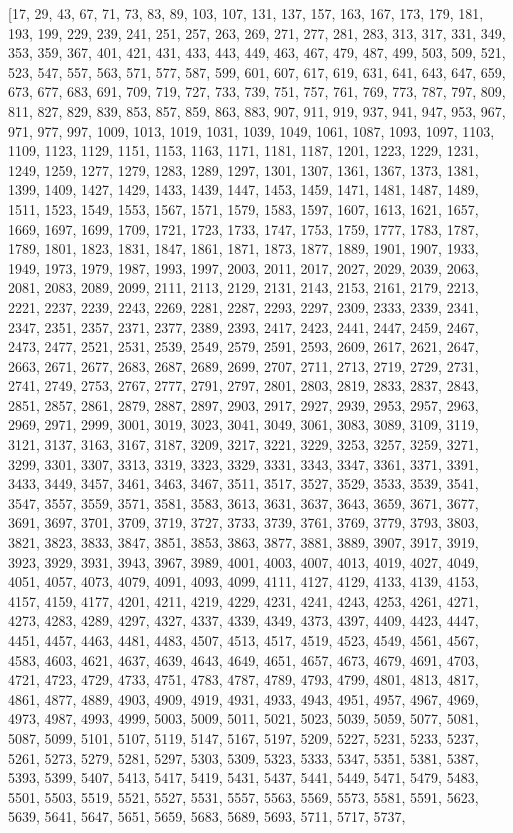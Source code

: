 \documentclass[10pt,twocolumn]{article}
\begin{document}
\begin{thebibliography}{9}
[17, 29, 43, 67, 71, 73, 83, 89, 103, 107, 131, 137, 157, 163, 167, 173, 179, 181, 193, 199, 229, 239, 241, 251, 257, 263, 269, 271, 277, 281, 283, 313, 317, 331, 349, 353, 359, 367, 401, 421, 431, 433, 443, 449, 463, 467, 479, 487, 499, 503, 509, 521, 523, 547, 557, 563, 571, 577, 587, 599, 601, 607, 617, 619, 631, 641, 643, 647, 659, 673, 677, 683, 691, 709, 719, 727, 733, 739, 751, 757, 761, 769, 773, 787, 797, 809, 811, 827, 829, 839, 853, 857, 859, 863, 883, 907, 911, 919, 937, 941, 947, 953, 967, 971, 977, 997, 1009, 1013, 1019, 1031, 1039, 1049, 1061, 1087, 1093, 1097, 1103, 1109, 1123, 1129, 1151, 1153, 1163, 1171, 1181, 1187, 1201, 1223, 1229, 1231, 1249, 1259, 1277, 1279, 1283, 1289, 1297, 1301, 1307, 1361, 1367, 1373, 1381, 1399, 1409, 1427, 1429, 1433, 1439, 1447, 1453, 1459, 1471, 1481, 1487, 1489, 1511, 1523, 1549, 1553, 1567, 1571, 1579, 1583, 1597, 1607, 1613, 1621, 1657, 1669, 1697, 1699, 1709, 1721, 1723, 1733, 1747, 1753, 1759, 1777, 1783, 1787, 1789, 1801, 1823, 1831, 1847, 1861, 1871, 1873, 1877, 1889, 1901, 1907, 1933, 1949, 1973, 1979, 1987, 1993, 1997, 2003, 2011, 2017, 2027, 2029, 2039, 2063, 2081, 2083, 2089, 2099, 2111, 2113, 2129, 2131, 2143, 2153, 2161, 2179, 2213, 2221, 2237, 2239, 2243, 2269, 2281, 2287, 2293, 2297, 2309, 2333, 2339, 2341, 2347, 2351, 2357, 2371, 2377, 2389, 2393, 2417, 2423, 2441, 2447, 2459, 2467, 2473, 2477, 2521, 2531, 2539, 2549, 2579, 2591, 2593, 2609, 2617, 2621, 2647, 2663, 2671, 2677, 2683, 2687, 2689, 2699, 2707, 2711, 2713, 2719, 2729, 2731, 2741, 2749, 2753, 2767, 2777, 2791, 2797, 2801, 2803, 2819, 2833, 2837, 2843, 2851, 2857, 2861, 2879, 2887, 2897, 2903, 2917, 2927, 2939, 2953, 2957, 2963, 2969, 2971, 2999, 3001, 3019, 3023, 3041, 3049, 3061, 3083, 3089, 3109, 3119, 3121, 3137, 3163, 3167, 3187, 3209, 3217, 3221, 3229, 3253, 3257, 3259, 3271, 3299, 3301, 3307, 3313, 3319, 3323, 3329, 3331, 3343, 3347, 3361, 3371, 3391, 3433, 3449, 3457, 3461, 3463, 3467, 3511, 3517, 3527, 3529, 3533, 3539, 3541, 3547, 3557, 3559, 3571, 3581, 3583, 3613, 3631, 3637, 3643, 3659, 3671, 3677, 3691, 3697, 3701, 3709, 3719, 3727, 3733, 3739, 3761, 3769, 3779, 3793, 3803, 3821, 3823, 3833, 3847, 3851, 3853, 3863, 3877, 3881, 3889, 3907, 3917, 3919, 3923, 3929, 3931, 3943, 3967, 3989, 4001, 4003, 4007, 4013, 4019, 4027, 4049, 4051, 4057, 4073, 4079, 4091, 4093, 4099, 4111, 4127, 4129, 4133, 4139, 4153, 4157, 4159, 4177, 4201, 4211, 4219, 4229, 4231, 4241, 4243, 4253, 4261, 4271, 4273, 4283, 4289, 4297, 4327, 4337, 4339, 4349, 4373, 4397, 4409, 4423, 4447, 4451, 4457, 4463, 4481, 4483, 4507, 4513, 4517, 4519, 4523, 4549, 4561, 4567, 4583, 4603, 4621, 4637, 4639, 4643, 4649, 4651, 4657, 4673, 4679, 4691, 4703, 4721, 4723, 4729, 4733, 4751, 4783, 4787, 4789, 4793, 4799, 4801, 4813, 4817, 4861, 4877, 4889, 4903, 4909, 4919, 4931, 4933, 4943, 4951, 4957, 4967, 4969, 4973, 4987, 4993, 4999, 5003, 5009, 5011, 5021, 5023, 5039, 5059, 5077, 5081, 5087, 5099, 5101, 5107, 5119, 5147, 5167, 5197, 5209, 5227, 5231, 5233, 5237, 5261, 5273, 5279, 5281, 5297, 5303, 5309, 5323, 5333, 5347, 5351, 5381, 5387, 5393, 5399, 5407, 5413, 5417, 5419, 5431, 5437, 5441, 5449, 5471, 5479, 5483, 5501, 5503, 5519, 5521, 5527, 5531, 5557, 5563, 5569, 5573, 5581, 5591, 5623, 5639, 5641, 5647, 5651, 5659, 5683, 5689, 5693, 5711, 5717, 5737, 
\end{thebibliography}
\end{document}
